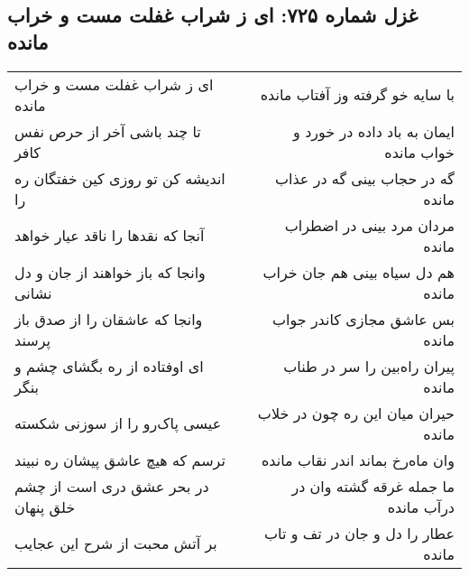 \begin{center}
\section*{غزل شماره ۷۲۵: ای ز شراب غفلت مست و خراب مانده}
\label{sec:725}
\begin{longtable}{l p{0.5cm} r}
ای ز شراب غفلت مست و خراب مانده
&&
با سایه خو گرفته وز آفتاب مانده
\\
تا چند باشی آخر از حرص نفس کافر
&&
ایمان به باد داده در خورد و خواب مانده
\\
اندیشه کن تو روزی کین خفتگان ره را
&&
گه در حجاب بینی گه در عذاب مانده
\\
آنجا که نقدها را ناقد عیار خواهد
&&
مردان مرد بینی در اضطراب مانده
\\
وانجا که باز خواهند از جان و دل نشانی
&&
هم دل سیاه بینی هم جان خراب مانده
\\
وانجا که عاشقان را از صدق باز پرسند
&&
بس عاشق مجازی کاندر جواب مانده
\\
ای اوفتاده از ره بگشای چشم و بنگر
&&
پیران راه‌بین را سر در طناب مانده
\\
عیسی پاک‌رو را از سوزنی شکسته
&&
حیران میان این ره چون در خلاب مانده
\\
ترسم که هیچ عاشق پیشان ره نبیند
&&
وان ماه‌رخ بماند اندر نقاب مانده
\\
در بحر عشق دری است از چشم خلق پنهان
&&
ما جمله غرقه گشته وان در درآب مانده
\\
بر آتش محبت از شرح این عجایب
&&
عطار را دل و جان در تف و تاب مانده
\\
\end{longtable}
\end{center}
